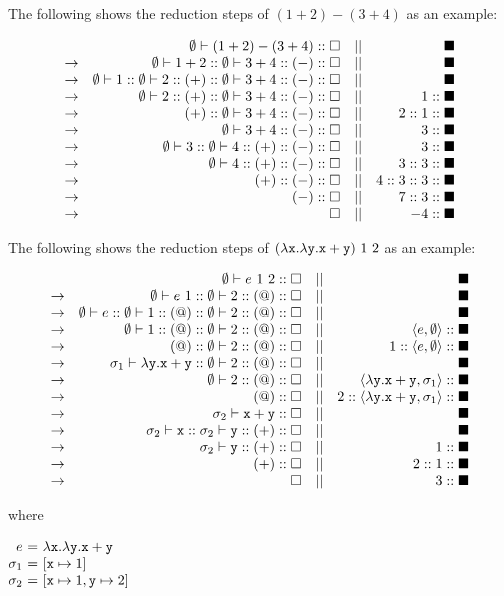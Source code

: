 The following shows the reduction steps of $(1+2)-(3+4)$ as an example:

\[
\begin{array}{lrcr}
& \emptyset\vdash(1+2)-(3+4)::\square &||& \blacksquare \\
\rightarrow & \emptyset\vdash1+2::\emptyset\vdash3+4::(-):: \square &||&
\blacksquare \\
\rightarrow &
\emptyset\vdash1::\emptyset\vdash2::(+):: \emptyset\vdash3+4::(-):: \square &||&
\blacksquare \\
\rightarrow & \emptyset\vdash2::(+):: \emptyset\vdash3+4::(-):: \square &||&
1::\blacksquare \\
\rightarrow & (+):: \emptyset\vdash3+4::(-):: \square &||& 2::1::\blacksquare \\
\rightarrow & \emptyset\vdash3+4::(-):: \square &||& 3::\blacksquare \\
\rightarrow & \emptyset\vdash3::\emptyset\vdash4::(+):: (-):: \square &||&
3::\blacksquare \\
\rightarrow & \emptyset\vdash4::(+):: (-):: \square &||& 3::3::\blacksquare \\
\rightarrow & (+):: (-):: \square &||& 4::3::3::\blacksquare \\
\rightarrow & (-):: \square &||& 7::3::\blacksquare \\
\rightarrow & \square &||& -4::\blacksquare \\
\end{array}
\]

The following shows the reduction steps of
$(\lambda\texttt{x}.\lambda\texttt{y}.\texttt{x}+\texttt{y})\ 1\ 2$ as an example:

\[
\begin{array}{lrcr}
              & \emptyset\vdash e\ 1\ 2:: \square &||& \blacksquare \\
  \rightarrow & \emptyset\vdash e\ 1:: \emptyset\vdash2:: (@):: \square &||& \blacksquare \\
  \rightarrow & \emptyset\vdash e:: \emptyset\vdash1:: (@):: \emptyset\vdash2:: (@):: \square &||& \blacksquare \\
  \rightarrow & \emptyset\vdash1:: (@):: \emptyset\vdash2:: (@):: \square &||& \langle e,\emptyset\rangle::\blacksquare \\
  \rightarrow & (@):: \emptyset\vdash2:: (@):: \square &||& 1::\langle e,\emptyset\rangle::\blacksquare \\
  \rightarrow & \sigma_1\vdash\lambda \texttt{y}.\texttt{x}+\texttt{y}:: \emptyset\vdash2:: (@):: \square &||& \blacksquare \\
  \rightarrow & \emptyset\vdash2:: (@):: \square &||& \langle\lambda\texttt{y}.\texttt{x}+\texttt{y},\sigma_1\rangle::\blacksquare \\
  \rightarrow & (@):: \square &||& 2::\langle\lambda\texttt{y}.\texttt{x}+\texttt{y},\sigma_1\rangle::\blacksquare \\
  \rightarrow & \sigma_2\vdash\texttt{x}+\texttt{y}:: \square &||& \blacksquare \\
  \rightarrow & \sigma_2\vdash\texttt{x}:: \sigma_2\vdash\texttt{y}:: (+):: \square &||& \blacksquare \\
  \rightarrow & \sigma_2\vdash\texttt{y}:: (+):: \square &||& 1::\blacksquare \\
  \rightarrow & (+):: \square &||& 2::1::\blacksquare \\
  \rightarrow & \square &||& 3::\blacksquare \\
\end{array}
\]

where

$
\begin{array}{@{}r@{~}c@{~}l}
  e&=&\efun{\cx}{\efun{\cy}{\cx+\cy}}\\
  \sigma_1&=&[\cx\mapsto1]\\
  \sigma_2&=&[\cx\mapsto1,\cy\mapsto2]\\
\end{array}
$

